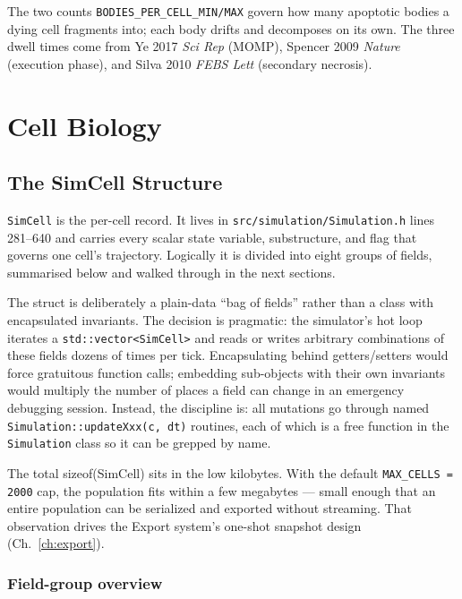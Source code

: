 \documentclass[11pt,letterpaper,twoside,openany]{book}
\newcommand{\code}[1]{\texttt{#1}}
\newcommand{\file}[1]{\texttt{\small#1}}
\begin{document}
The two counts \code{BODIES\_PER\_CELL\_MIN/MAX} govern how many
apoptotic bodies a dying cell fragments into; each body drifts and
decomposes on its own. The three dwell times come from Ye 2017
\emph{Sci Rep} (MOMP), Spencer 2009 \emph{Nature} (execution phase),
and Silva 2010 \emph{FEBS Lett} (secondary necrosis).

\part{Cell Biology}

\chapter{The SimCell Structure}
\label{ch:simcell}

\code{SimCell} is the per-cell record. It lives in
\file{src/simulation/Simulation.h} lines 281--640 and carries every
scalar state variable, substructure, and flag that governs one cell's
trajectory. Logically it is divided into eight groups of fields,
summarised below and walked through in the next sections.

The struct is deliberately a plain-data ``bag of fields'' rather than
a class with encapsulated invariants. The decision is pragmatic: the
simulator's hot loop iterates a \code{std::vector<SimCell>} and reads
or writes arbitrary combinations of these fields dozens of times per
tick. Encapsulating behind getters/setters would force gratuitous
function calls; embedding sub-objects with their own invariants would
multiply the number of places a field can change in an emergency
debugging session. Instead, the discipline is: all mutations go
through named \code{Simulation::updateXxx(c, dt)} routines, each of
which is a free function in the \code{Simulation} class so it can be
grepped by name.

The total sizeof(SimCell) sits in the low kilobytes. With the
default \code{MAX\_CELLS = 2000} cap, the population fits within a
few megabytes --- small enough that an entire population can be
serialized and exported without streaming. That observation drives
the Export system's one-shot snapshot design (Ch.~\ref{ch:export}).

\section{Field-group overview}
\end{document}
